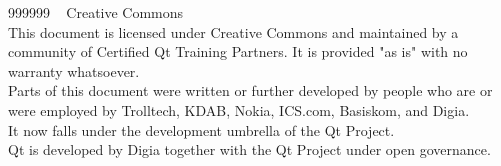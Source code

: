   \begin{slide}{999999}
    \vspace{1em}
    \textcopyright~ Creative Commons\\
    This document is licensed under Creative Commons and maintained by
    a community of Certified Qt Training Partners. It is provided
    "as is" with no warranty whatsoever. \\
    \vspace{.5em}
    Parts of this document were written or further developed by people
    who are or were employed by Trolltech, KDAB, Nokia, ICS.com,
    Basiskom, and Digia. \\
    \vspace{.5em}
    It now falls under the development umbrella of the Qt Project. \\
    \vspace{.5em}
    Qt is developed by Digia together with the Qt Project under open
    governance.\\
  \end{slide}
